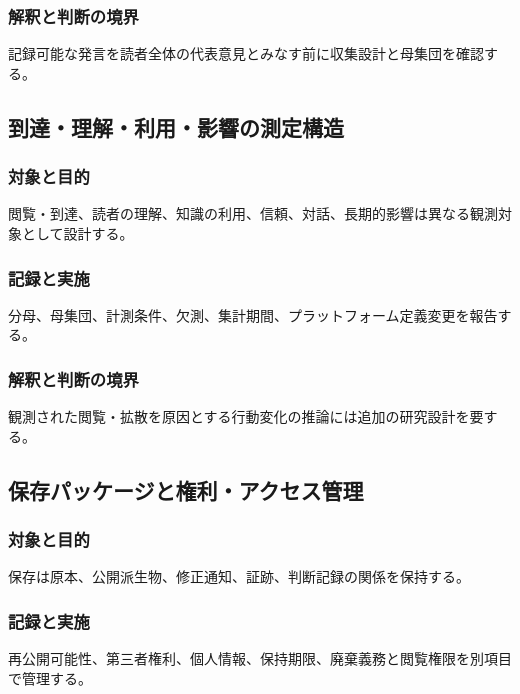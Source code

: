 \documentclass[a4paper,11pt]{article}
\begin{document}
\subsubsection{解釈と判断の境界}
\par 記録可能な発言を読者全体の代表意見とみなす前に収集設計と母集団を確認する。\par\medskip
\subsection{到達・理解・利用・影響の測定構造}
\subsubsection{対象と目的}
\par 閲覧・到達、読者の理解、知識の利用、信頼、対話、長期的影響は異なる観測対象として設計する。\par\medskip
\subsubsection{記録と実施}
\par 分母、母集団、計測条件、欠測、集計期間、プラットフォーム定義変更を報告する。\par\medskip
\subsubsection{解釈と判断の境界}
\par 観測された閲覧・拡散を原因とする行動変化の推論には追加の研究設計を要する。\par\medskip
\subsection{保存パッケージと権利・アクセス管理}
\subsubsection{対象と目的}
\par 保存は原本、公開派生物、修正通知、証跡、判断記録の関係を保持する。\par\medskip
\subsubsection{記録と実施}
\par 再公開可能性、第三者権利、個人情報、保持期限、廃棄義務と閲覧権限を別項目で管理する。\par\medskip
\end{document}
